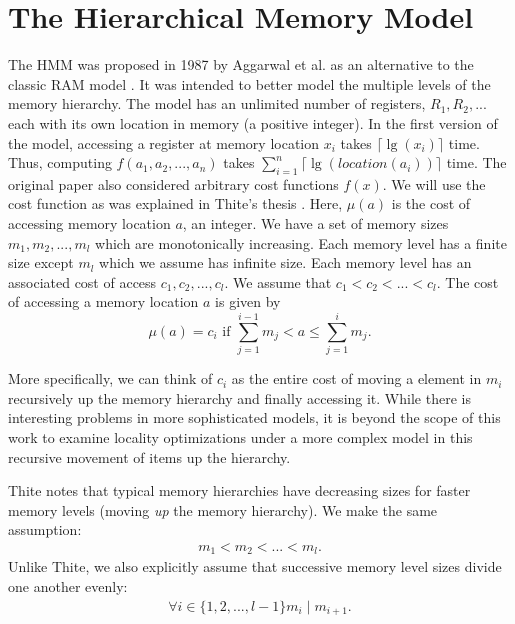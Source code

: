 \documentclass[letterpaper,12pt,titlepage,oneside,final]{book}
\theoremstyle{plain}
\begin{document}
\section{The Hierarchical Memory Model}\label{The Hierarchical Memory Model}

The HMM was proposed in 1987 by Aggarwal et al. as an alternative to the classic RAM model \cite{aggarwal1987model}. It was intended to better model the multiple levels of the memory hierarchy. The model has an unlimited number of registers, $R_1, R_2, ...$ each with its own location in memory (a positive integer). In the first version of the model, accessing a register at memory location $x_i$ takes $\lceil \lg(x_i) \rceil$ time. Thus, computing $f(a_1, a_2, ..., a_n)$ takes $\sum_{i=1}^{n} \lceil \lg(location(a_i)) \rceil$ time. The original paper also considered arbitrary cost functions $f(x)$. We will use the cost function as was explained in Thite's thesis \cite{thite2008optimum}. Here, $\mu (a)$ is the cost of accessing memory location $a$, an integer. We have a set of memory sizes $m_1, m_2, ..., m_l$ which are monotonically increasing. Each memory level has a finite size except $m_l$ which we assume has infinite size. Each memory level has an associated cost of access $c_1, c_2, ..., c_l$. We assume that $c_1 < c_2 < ... < c_l$. The cost of accessing a memory location $a$ is given by
\begin{equation}
\mu (a) = c_i \text{ if } \sum_{j = 1}^{i-1}m_j  < a \leq \sum_{j = 1}^{i}m_j.
\end{equation}

\noindent More specifically, we can think of $c_i$ as the entire cost of moving a element in $m_i$ recursively up the memory hierarchy and finally accessing it. While there is interesting problems in more sophisticated models, it is beyond the scope of this work to examine locality optimizations under a more complex model in this recursive movement of items up the hierarchy.

Thite notes that typical memory hierarchies have decreasing sizes for faster memory levels (moving \textit{up} the memory hierarchy). We make the same assumption:
\begin{align*}
m_1 < m_2 < ... < m_l.
\end{align*}
Unlike Thite, we also explicitly assume that successive memory level sizes divide one another evenly:
\begin{align*}
\forall i \in  \{1,2,...,l-1\} m_i \mid m_{i+1}.
\end{align*}
\end{document}
